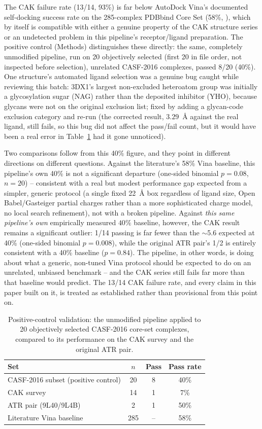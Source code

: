 \documentclass[11pt]{article}
\begin{document}
The CAK failure rate (13/14, 93\%) is far below AutoDock Vina's
documented self-docking success rate on the 285-complex PDBbind Core Set
(58\%, \citep{zhang2023}), which by itself is compatible with either a
genuine property of the CAK structure series or an undetected problem in
this pipeline's receptor/ligand preparation. The positive control
(Methods) distinguishes these directly: the same, completely unmodified
pipeline, run on 20 objectively selected (first 20 in file order, not
inspected before selection), unrelated CASF-2016 complexes, passed
8/20 (40\%). One structure's automated ligand selection was a genuine
bug caught while reviewing this batch: 3DX1's largest non-excluded
heteroatom group was initially a glycosylation sugar (NAG) rather than
the deposited inhibitor (YHO), because glycans were not on the original
exclusion list; fixed by adding a glycan-code exclusion category and
re-run (the corrected result, $3.29$~{\AA} against the real ligand, still
fails, so this bug did not affect the pass/fail count, but it would have
been a real error in Table~\ref{tab:casf} had it gone unnoticed).

Two comparisons follow from this 40\% figure, and they point in different
directions on different questions. Against the literature's 58\% Vina
baseline, this pipeline's own 40\% is not a significant departure
(one-sided binomial $p=0.08$, $n=20$) -- consistent with a real but
modest performance gap expected from a simpler, generic protocol (a
single fixed 22~{\AA} box regardless of ligand size, Open Babel/Gasteiger
partial charges rather than a more sophisticated charge model, no local
search refinement), not with a broken pipeline. Against \emph{this same
pipeline's own} empirically measured $40\%$ baseline, however, the CAK
result remains a significant outlier: 1/14 passing is far fewer than the
$\sim$5.6 expected at 40\% (one-sided binomial $p=0.008$), while the
original ATR pair's 1/2 is entirely consistent with a 40\% baseline
($p=0.84$). The pipeline, in other words, is doing about what a
generic, non-tuned Vina protocol should be expected to do on an
unrelated, unbiased benchmark -- and the CAK series still fails far more
than that baseline would predict. The 13/14 CAK failure rate, and every
claim in this paper built on it, is treated as established rather than
provisional from this point on.

\begin{table}[htbp]
\centering
\caption{Positive-control validation: the unmodified pipeline applied to 20 objectively selected CASF-2016 core-set complexes, compared to its performance on the CAK survey and the original ATR pair.}
\label{tab:casf}
\small
\begin{tabular}{lccc}
\toprule
Set & $n$ & Pass & Pass rate \\
\midrule
CASF-2016 subset (positive control) & 20 & 8 & 40\% \\
CAK survey & 14 & 1 & 7\% \\
ATR pair (9L40/9L4B) & 2 & 1 & 50\% \\
Literature Vina baseline \citep{zhang2023} & 285 & -- & 58\% \\
\bottomrule
\end{tabular}
\end{table}
\end{document}
